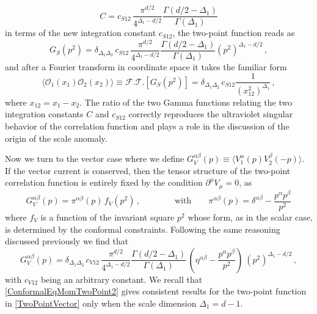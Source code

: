 \documentclass[a4paper,11pt,openright,twoside]{book}
\numberwithin{equation}{section}
\begin{document}
%
\begin{equation}
	C=c_{S 12} \,  \frac{\pi^{d/2}}{4^{\Delta_1 - d/2}} \frac{\Gamma(d/2 - \Delta_1)}{\Gamma(\Delta_1)} 
\end{equation}
%
in terms of the new integration constant $c_{S 12}$, the two-point function reads as
\begin{equation}
	\label{TwoPointScalar2}
	G_S(p^2) =  \delta_{\Delta_1 \Delta_2}  \, c_{S 12} \,  \frac{\pi^{d/2}}{4^{\Delta_1 - d/2}} \frac{\Gamma(d/2 - \Delta_1)}{\Gamma(\Delta_1)} 
	(p^2)^{\Delta_1 - d/2} \,,
\end{equation}
and after a Fourier transform in coordinate space it takes the familiar form
%
\begin{equation}
	\langle \mathcal O_1(x_1) \mathcal O_2(x_2) \rangle \equiv \mathcal{F.T.}\left[ G_S(p^2) \right] =  \delta_{\Delta_1 \Delta_2} \,  c_{S 12} 
	\frac{1}{(x_{12}^2)^{\Delta_1}} \,,
\end{equation}
%
where $x_{12} = x_1 - x_2$. 
The ratio of the two Gamma functions relating the two integration constants $C$ and $c_{S 12}$ correctly reproduces the ultraviolet singular behavior of the correlation function and plays a role in the discussion of the origin of the scale anomaly.

Now we turn to the vector case where we define $G_V^{\alpha \beta}(p) \equiv \langle V_1^\alpha(p) V_2^\beta(-p) \rangle$. If the 
vector current is conserved, then the tensor structure of the two-point correlation function is entirely fixed by the 
condition $\partial^\mu V_\mu = 0$, as 
%
\begin{equation}
	\label{TwoPointVector0}
	G_V^{\alpha \beta}(p) =  \pi^{\alpha\beta}(p) \, f_V(p^2)\,, \qquad \qquad \mbox{with} \qquad
	\pi^{\alpha\beta}(p) = \delta^{\alpha \beta} -\frac{p^\alpha p^\beta}{p^2} 
\end{equation}
%
where $f_V$ is a function of the invariant square $p^2$ whose form, as in the scalar case, is determined by the conformal constraints. 
Following the same reasoning discussed previously we find that
%
\begin{equation}
	\label{TwoPointVector}
	G_V^{\alpha \beta}(p) = \delta_{\Delta_1 \Delta_2}  \, c_{V 12}\, 
	\frac{\pi^{d/2}}{4^{\Delta_1 - d/2}} \frac{\Gamma(d/2 - \Delta_1)}{\Gamma(\Delta_1)}\,
	\left( \eta^{\alpha \beta} -\frac{p^\alpha p^\beta}{p^2} \right)\
	(p^2)^{\Delta_1-d/2} \,,
\end{equation}
%
with $c_{V12}$ being an arbitrary constant. 
%
We recall that \eqref{ConformalEqMomTwoPoint2} gives consistent results for the two-point function in \eqref{TwoPointVector} only when the scale dimension $\Delta_1 = d - 1$. 
\end{document}
